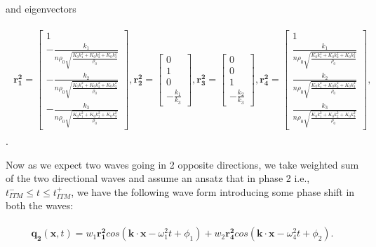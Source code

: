 and eigenvectors

\begin{align}
    \begin{split}
    \mathbf{r_1^2} = \begin{bmatrix}
        1 \\
-\frac{k_{1}}{n \rho_{0} \sqrt{\frac{K_{0} k_{1}^{2} + K_{0} k_{2}^{2} + K_{0} k_{3}^{2}}{\rho_{0}}}} \\
-\frac{k_{2}}{n \rho_{0} \sqrt{\frac{K_{0} k_{1}^{2} + K_{0} k_{2}^{2} + K_{0} k_{3}^{2}}{\rho_{0}}}} \\
-\frac{k_{3}}{n \rho_{0} \sqrt{\frac{K_{0} k_{1}^{2} + K_{0} k_{2}^{2} + K_{0} k_{3}^{2}}{\rho_{0}}}}
        \end{bmatrix},
        \mathbf{r_2^2} = \begin{bmatrix}
            0 \\
            1 \\
            0 \\
            -\frac{k_{1}}{k_{3}}
            \end{bmatrix},
            \mathbf{r_3^2} = \begin{bmatrix}
                0 \\
0 \\
1 \\
-\frac{k_{2}}{k_{3}}
                \end{bmatrix},
                \mathbf{r_4^2} = \begin{bmatrix}
                    1 \\
                    \frac{k_{1}}{n \rho_{0} \sqrt{\frac{K_{0} k_{1}^{2} + K_{0} k_{2}^{2} + K_{0} k_{3}^{2}}{\rho_{0}}}} \\
                    \frac{k_{2}}{n \rho_{0} \sqrt{\frac{K_{0} k_{1}^{2} + K_{0} k_{2}^{2} + K_{0} k_{3}^{2}}{\rho_{0}}}} \\
                    \frac{k_{3}}{n \rho_{0} \sqrt{\frac{K_{0} k_{1}^{2} + K_{0} k_{2}^{2} + K_{0} k_{3}^{2}}{\rho_{0}}}}
                    \end{bmatrix},
    \end{split}
\end{align} .

Now as we expect two waves going in 2 opposite directions, we take weighted sum of the two directional waves and assume an ansatz that in phase 2 i.e., $t_{ITM}^- \leq t \leq t_{ITM}^+ $, we have the following wave form introducing some phase shift in both the waves:

\begin{align}
    \begin{split}
        \mathbf{q_2} \left(\mathbf{x}, t\right) = w_1 \mathbf{r_1^2} cos\left(\mathbf{k}\cdot\mathbf{x} -\omega_1^2 t + \phi_1\right) + w_2 \mathbf{r_4^2} cos\left(\mathbf{k}\cdot\mathbf{x} - \omega_4^2 t + \phi_2\right).
    \end{split}
    \end{align}

